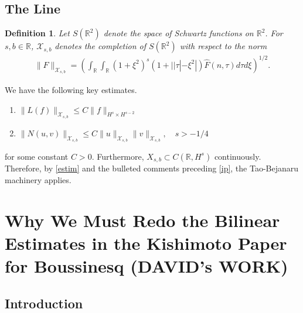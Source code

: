 \documentclass{amsart}
\newtheorem{definition}[theorem]{Definition}
\newcommand{\rr}{\mathbb{R}}
\newcommand{\wh}{\widehat}
\begin{document}
\subsection{The Line} 
\begin{definition}
  Let $S(\rr^{2})$ denote the space of Schwartz functions on
  $\rr^{2}$.  For $s, b \in \rr$, $\mathcal{X}_{s,b}$
  denotes the completion of $S(\rr^{2})$ with
  respect to the norm
  \begin{equation}
  \begin{split}
    \|F\|_{\mathcal{X}_{s,b}} = \left( \int_{\rr} \int_{\rr} (1 + \xi^{2})^{s}
    (1 + | | \tau | - \xi^{2} |) \wh{F}(n, \tau) d \tau d \xi \right)^{1/2}.
  \end{split}
  \label{eqn:bous-norm-real}
  \end{equation}
  \end{definition}
We have the following key estimates.
%
\begin{enumerate}
  \item{$\|L(f)\|_{\mathcal{X}_{s,b}} \le C \| f \|_{H^s \times H^{s-2}}$}
  \item{$\| N(u, v) \|_{\mathcal{X}_{s,b}} \le C  \| u \|_{\mathcal{X}_{s,b}} \| v \|_{\mathcal{X}_{s,b}}, \quad s > -1/4$} 
\end{enumerate}
for some constant $C > 0$. Furthermore, $X_{s,b} \subset C(\rr, H^{s})$
continuously. Therefore, by \eqref{estim} and the bulleted comments preceding
\eqref{ip}, the Tao-Bejanaru machinery applies.

\section{Why We Must Redo the Bilinear Estimates in the
    Kishimoto Paper for Boussinesq (DAVID's WORK)}
\subsection{Introduction} 
\end{document}
